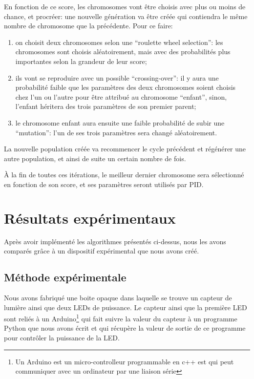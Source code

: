 \documentclass[a4paper,10pt]{report}
\begin{document}
En fonction de ce score, les chromosomes vont être choisis avec plus ou moins de chance, et procréer: une nouvelle génération va être créée qui contiendra le même nombre de chromosome que la précédente. Pour ce faire:
\begin{enumerate}
  \item on choisit deux chromosomes selon une ``roulette wheel selection'': les chromosomes sont choisis aléatoirement, mais avec des probabilités plus importantes selon la grandeur de leur score;
  \item ils vont se reproduire avec un possible ``crossing-over'': il y aura une probabilité faible que les paramètres des deux chromosomes soient choisis chez l'un ou l'autre pour être attribué au chromosome ``enfant'', sinon, l'enfant héritera des trois paramètres de son premier parent;
  \item le chromosome enfant aura ensuite une faible probabilité de subir une ``mutation'': l'un de ses trois paramètres sera changé aléatoirement.
\end{enumerate}

La nouvelle population créée va recommencer le cycle précédent et régénérer une autre population, et ainsi de suite un certain nombre de fois.

À la fin de toutes ces itérations, le meilleur dernier chromosome sera sélectionné en fonction de son score, et ses paramètres seront utilisés par PID.



\chapter{Résultats expérimentaux}

Après avoir implémenté les algorithmes présentés ci-dessus, nous les avons comparés grâce à un dispositif expérimental que nous avons créé.

\section{Méthode expérimentale}

Nous avons fabriqué une boite opaque dans laquelle se trouve un capteur de lumière ainsi que deux LEDs de puissance. Le capteur ainsi que la première LED sont reliés à un Arduino\footnote{Un Arduino est un micro-controlleur programmable en c++ est qui peut communiquer avec un ordinateur par une liaison série} qui fait suivre la valeur du capteur à un programme Python que nous avons écrit et qui récupère la valeur de sortie de ce programme pour contrôler la puissance de la LED.
\end{document}
